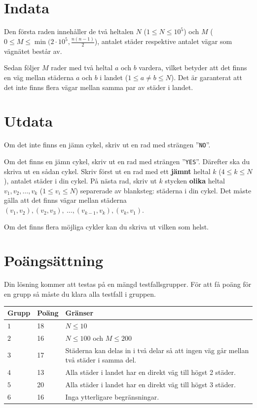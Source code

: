 \section*{Indata}
Den första raden innehåller de två heltalen $N$ ($1 \le N \le 10^5$) och $M$ ($0 \le M \le \min(2 \cdot 10^5, \frac{n(n-1)}{2}$), antalet städer respektive antalet vägar som vägnätet består av.

Sedan följer $M$ rader med två heltal $a$ och $b$ vardera, vilket betyder att det finns en väg mellan städerna $a$ och $b$ i landet ($1\le a \neq b \le N$).
Det är garanterat att det inte finns flera vägar mellan samma par av städer i landet.

\section*{Utdata}
Om det inte finns en jämn cykel, skriv ut en rad med strängen ''\texttt{NO}''.

Om det finns en jämn cykel, skriv ut en rad med strängen ''\texttt{YES}''.
Därefter ska du skriva ut en sådan cykel.
Skriv först ut en rad med ett \textbf{jämnt} heltal $k$ ($4\le k \le N$), antalet städer i din cykel.
På nästa rad, skriv ut $k$ stycken \textbf{olika} heltal $v_{1}, v_{2}, \ldots, v_{k}$ ($1\le v_{i}\le N$) separerade av blanksteg: städerna i din cykel.
Det måste gälla att det finns vägar mellan städerna $(v_{1},v_{2}), (v_{2},v_{3}),\ \ldots, (v_{k-1},v_{k}), (v_{k}, v_{1})$.

Om det finns flera möjliga cykler kan du skriva ut vilken som helst.

\section*{Poängsättning}
Din lösning kommer att testas på en mängd testfallsgrupper.
För att få poäng för en grupp så måste du klara alla testfall i gruppen.

\noindent
\begin{tabular}{| l | l | l |}
  \hline
  \textbf{Grupp} & \textbf{Poäng} & \textbf{Gränser} \\ \hline
  $1$ & 18 & $N\le 10$ \\ \hline
  $2$ & 16 & $N\le 100$ och $M\le 200$ \\ \hline
  $3$  & 17 & Städerna kan delas in i två delar så att ingen väg går mellan två städer i samma del. \\ \hline
  $4$  & 13 & Alla städer i landet har en direkt väg till högst 2 städer. \\ \hline
  $5$  & 20 & Alla städer i landet har en direkt väg till högst 3 städer. \\ \hline
  $6$  & 16 & Inga ytterligare begränsningar. \\ \hline
\end{tabular}
